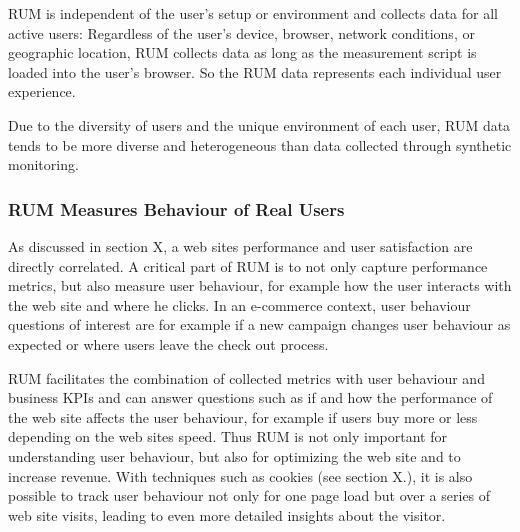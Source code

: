 
RUM is independent of the user's setup or environment and collects data for all active users:
Regardless of the user's device, browser, network conditions, or geographic location, RUM collects data as long as the measurement script is loaded into the user's browser.%
So the RUM data represents each individual user experience. %

Due to the diversity of users and the unique environment of each user, RUM data tends to be more diverse and heterogeneous than data collected through synthetic monitoring. %


\subsubsection{RUM Measures Behaviour of Real Users}



As discussed in section X, a web sites performance and user satisfaction are directly correlated.
A critical part of RUM is to not only capture performance metrics, but also measure user behaviour, for example how the user interacts with the web site and where he clicks. %
In an e-commerce context, user behaviour questions of interest are for example if a new campaign changes user behaviour as expected or where users leave the check out process. %

RUM facilitates the combination of collected metrics with user behaviour and business KPIs and can answer questions such as if and how the performance of the web site affects the user behaviour, for example if users buy more or less depending on the web sites speed.%
Thus RUM is not only important for understanding user behaviour, but also for optimizing the web site and to increase revenue.
With techniques such as cookies (see section X.), it is also possible to track user behaviour not only for one page load but over a series of web site visits, leading to even more detailed insights about the visitor. %


